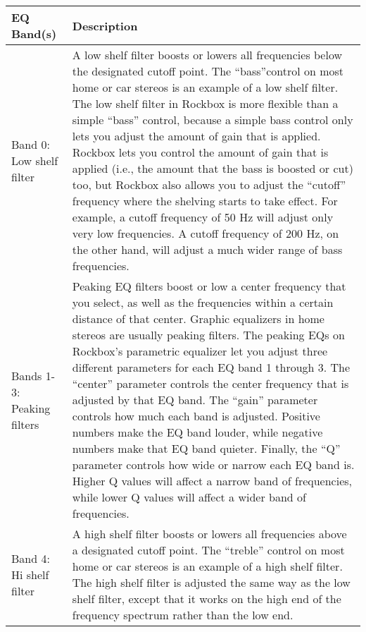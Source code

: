{  \begin{table}
  \begin{center}
  \begin{tabularx}{\textwidth}{lX}\toprule
      \textbf{EQ Band(s)} & \textbf{Description} \\\midrule
        Band 0: Low shelf filter
        & A low shelf filter boosts or lowers all frequencies below the
        designated cutoff point. The ``bass''control on most home or car
        stereos is an example of a low shelf filter. The low shelf
        filter in Rockbox is more flexible than a simple ``bass''
        control, because a simple bass control only lets you adjust
        the amount of gain that is applied. Rockbox lets you control
        the amount of gain that is applied (i.e., the amount that the
        bass is boosted or cut) too, but Rockbox also allows you to
        adjust the ``cutoff'' frequency where the shelving starts to take
        effect. For example, a cutoff frequency of 50 Hz will adjust only very
        low frequencies. A cutoff frequency of 200 Hz, on the other hand, will
        adjust a much wider range of bass frequencies.\\
        Bands 1-3: Peaking filters
        & Peaking EQ filters boost or low a center frequency that you select,
        as well as the frequencies within a certain distance of that
        center. Graphic equalizers in home stereos are usually peaking
        filters. The peaking EQs on Rockbox's parametric equalizer let
        you adjust three different parameters for each EQ band 1
        through 3. The ``center'' parameter controls the center
        frequency that is adjusted by that EQ band. The ``gain''
        parameter controls how much each band is adjusted. Positive
        numbers make the EQ band louder, while negative numbers make
        that EQ band quieter. Finally, the ``Q'' parameter controls how wide
        or narrow each EQ band is. Higher Q values will affect a
        narrow band of frequencies, while lower Q values will affect
        a wider band of frequencies.\\
        Band 4: Hi shelf filter
        & A high shelf filter boosts or lowers all frequencies above a
        designated cutoff point. The ``treble'' control on most home or car
        stereos is an example of a high shelf filter. The high shelf filter is
        adjusted the same way as the low shelf filter, except that it works on
        the high end of the frequency spectrum rather than the low end.\\
        \bottomrule
  \end{tabularx}
  \end{center}
  \end{table}

}
